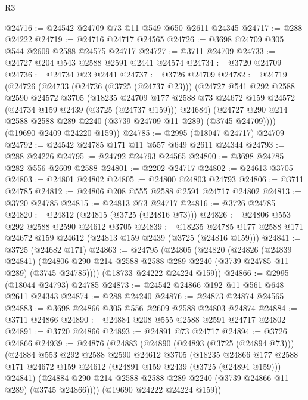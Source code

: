 \begin{lexlean}{R3}
\begin{coremodule}
@24716 := @24542 @24709 @73 @11 @549 @650 @2611 @24345
@24717 := @288 @24222
@24719 := @24716 @24717 @24565
@24726 := @3698 @24709 @305 @544 @2609 @2588 @24575 @24717
@24727 := @3711 @24709
@24733 := @24727 @204 @543 @2588 @2591 @2441 @24574
@24734 := @3720 @24709
@24736 := @24734 @23 @2441
@24737 := @3726 @24709
@24782 := @24719
    (@24726
      (@24733
        (@24736 (@3725 (@24737 @23)))
        (@24727
          @541
          @292
          @2588
          @2590
          @24572
          @3705
          (@18235
            @24709
            @177
            @2588
            @73
            @24672
            @159
            @24572
            (@24734 @159 @2439 (@3725 (@24737 @159)))
            @24684)
          (@24727 @290 @214 @2588 @2588 @289 @2240 (@3739 @24709 @11 @289) (@3745 @24709))))
      (@19690 @2409 @24220 @159))
@24785 := @2995 (@18047 @24717) @24709
@24792 := @24542 @24785 @171 @11 @557 @649 @2611 @24344
@24793 := @288 @24226
@24795 := @24792 @24793 @24565
@24800 := @3698 @24785 @282 @556 @2609 @2588
@24801 := @2202 @24717
@24802 := @24613 @3705
@24803 := @24801 @24802
@24805 := @24800 @24803 @24793
@24806 := @3711 @24785
@24812 := @24806 @208 @555 @2588 @2591 @24717 @24802
@24813 := @3720 @24785
@24815 := @24813 @73 @24717
@24816 := @3726 @24785
@24820 := @24812 (@24815 (@3725 (@24816 @73)))
@24826 := @24806 @553 @292 @2588 @2590 @24612 @3705
@24839 := @18235 @24785 @177 @2588 @171 @24672 @159 @24612 (@24813 @159 @2439 (@3725 (@24816 @159)))
@24841 := @3725 (@24682 @171)
@24863 := @24795
    (@24805
      (@24820
        (@24826
          (@24839 @24841)
          (@24806 @290 @214 @2588 @2588 @289 @2240 (@3739 @24785 @11 @289) (@3745 @24785))))
      (@18733 @24222 @24224 @159))
@24866 := @2995 (@18044 @24793) @24785
@24873 := @24542 @24866 @192 @11 @561 @648 @2611 @24343
@24874 := @288 @24240
@24876 := @24873 @24874 @24565
@24883 := @3698 @24866 @305 @556 @2609 @2588 @24803 @24874
@24884 := @3711 @24866
@24890 := @24884 @208 @555 @2588 @2591 @24717 @24802
@24891 := @3720 @24866
@24893 := @24891 @73 @24717
@24894 := @3726 @24866
@24939 := @24876
    (@24883
      (@24890
        (@24893 (@3725 (@24894 @73)))
        (@24884
          @553
          @292
          @2588
          @2590
          @24612
          @3705
          (@18235
            @24866
            @177
            @2588
            @171
            @24672
            @159
            @24612
            (@24891 @159 @2439 (@3725 (@24894 @159)))
            @24841)
          (@24884 @290 @214 @2588 @2588 @289 @2240 (@3739 @24866 @11 @289) (@3745 @24866))))
      (@19690 @24222 @24224 @159))

\end{coremodule}
\end{lexlean}
